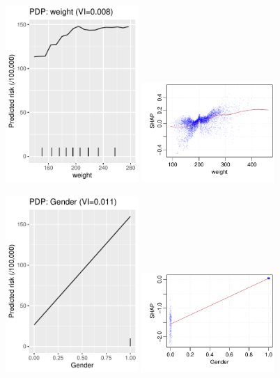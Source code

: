 \documentclass[12pt]{article}
\begin{document}
\begin{figure}[h]
\centering
\includegraphics[width=0.45\textwidth]{figures/pdp/weight.pdf}
\includegraphics[width=0.45\textwidth]{figures/shap/weight.pdf}
\end{figure}
\begin{figure}[h]
\centering
\includegraphics[width=0.45\textwidth]{figures/pdp/Gender.pdf}
\includegraphics[width=0.45\textwidth]{figures/shap/Gender.pdf}
\end{figure}
\end{document}
